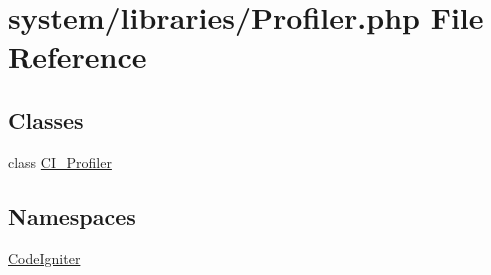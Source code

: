 \hypertarget{_profiler_8php}{}\section{system/libraries/\+Profiler.php File Reference}
\label{_profiler_8php}
\subsection*{Classes}
\begin{DoxyCompactItemize}
\item 
class \mbox{\hyperlink{class_c_i___profiler}{C\+I\+\_\+\+Profiler}}
\end{DoxyCompactItemize}
\subsection*{Namespaces}
\begin{DoxyCompactItemize}
\item 
 \mbox{\hyperlink{namespace_code_igniter}{Code\+Igniter}}
\end{DoxyCompactItemize}
